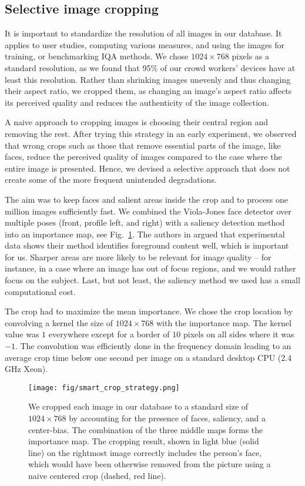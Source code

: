 \documentclass[10pt,journal,compsoc]{IEEEtran}
\begin{document}
\subsection{Selective image cropping}
\label{sec:selective_cropping}
It is important to standardize the resolution of all images in our database. It applies to user studies, computing various measures, and using the images for training, or benchmarking IQA methods. We chose $1024\times768$ pixels as a standard resolution, as we found that 95\% of our crowd workers' devices have at least this resolution. Rather than shrinking images unevenly and thus changing their aspect ratio, we cropped them, as changing an image's aspect ratio affects its perceived quality and reduces the authenticity of the image collection.

A naive approach to cropping images is choosing their central region and removing the rest. After trying this strategy in an early experiment, we observed that wrong crops such as those that remove essential parts of the image, like faces, reduce the perceived quality of images compared to the case where the entire image is presented. Hence, we devised a selective approach that does not create some of the more frequent unintended degradations.

The aim was to keep faces and salient areas inside the crop and to process one million images sufficiently fast. We combined the Viola-Jones face detector \cite{viola2004robust} over multiple poses (front, profile left, and right) with a saliency detection method \cite{hou_image_2012} into an importance map, see Fig.~\ref{fig:smart_crop}. The authors in \cite{hou_image_2012} argued that experimental data shows their method identifies foreground content well, which is important for us.  Sharper areas are more likely to be relevant for image quality -- for instance, in a case where an image has out of focus regions, and we would rather focus on the subject. Last, but not least, the saliency method we used has a small computational cost. 

The crop had to maximize the mean importance. We chose the crop location by convolving a kernel the size of $1024\times768$ with the importance map. The kernel value was $1$ everywhere except for a border of  $10$ pixels on all sides where it was $-1$. The convolution was efficiently done in the frequency domain leading to an average crop time below one second per image on a standard desktop CPU (2.4 GHz Xeon).

\begin{figure}[!htbp]
\centering
\texttt{[image: fig/smart\_crop\_strategy.png]}
\caption{We cropped each image in our database to a standard size of $1024\times768$ by accounting for the presence of faces, saliency, and a center-bias. The combination of the three middle maps forms the importance map. The cropping result, shown in light blue (solid line) on the rightmost image correctly includes the person's face, which would have been otherwise removed from the picture using a naive centered crop (dashed, red line).}
\label{fig:smart_crop}
\vspace{-10pt}
\end{figure}
\end{document}
